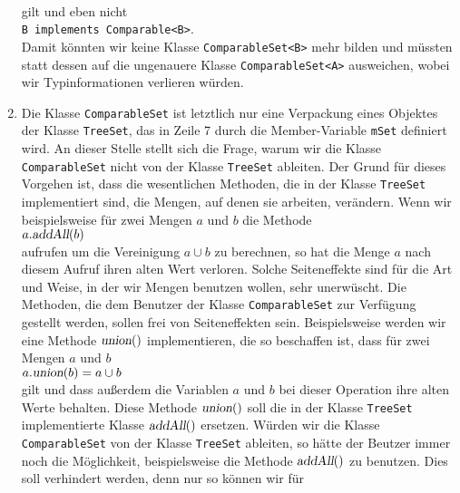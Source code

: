 \begin{enumerate}
      \\[0.2cm]
      gilt und eben nicht
      \\[0.2cm]
      \hspace*{1.3cm}
      \texttt{B implements Comparable<B>}.
      \\[0.2cm]
      Damit k\"onnten wir keine Klasse \texttt{ComparableSet<B>} mehr bilden und
      m\"ussten statt dessen auf die ungenauere Klasse \texttt{ComparableSet<A>} ausweichen,
      wobei  wir Typinformationen verlieren w\"urden.
\item Die Klasse \texttt{ComparableSet} ist letztlich nur eine Verpackung eines 
      Objektes der Klasse \texttt{TreeSet}, das in Zeile 7 durch die Member-Variable
      \texttt{mSet}  definiert wird.  An dieser Stelle stellt sich die Frage,
      warum wir die Klasse \texttt{ComparableSet} nicht von der Klasse \texttt{TreeSet}
      ableiten.  Der Grund f\"ur dieses Vorgehen ist, dass die wesentlichen Methoden, die in der
      Klasse \texttt{TreeSet} implementiert sind, die Mengen, auf denen sie arbeiten,
      ver\"andern.  Wenn wir beispielsweise f\"ur zwei Mengen $a$ und $b$ die Methode
      \\[0.2cm]
      \hspace*{1.3cm}
      $a.\textsl{addAll}(b)$
      \\[0.2cm]
      aufrufen um die Vereinigung $a \cup b$ zu berechnen, so hat die Menge $a$ nach
      diesem Aufruf ihren alten Wert verloren.  Solche Seiteneffekte sind f\"ur die Art und
      Weise, in der wir Mengen benutzen wollen, sehr unerw\"uscht.  Die Methoden, die dem
      Benutzer der Klasse \texttt{ComparableSet} zur Verf\"ugung gestellt werden, sollen
      frei von Seiteneffekten sein.  Beispielsweise werden wir eine Methode $\textsl{union}()$
      implementieren, die so beschaffen ist, dass f\"ur zwei Mengen $a$ und $b$
      \\[0.2cm]
      \hspace*{1.3cm}
      $a.\textsl{union}(b) = a \cup b$
      \\[0.2cm]
      gilt und dass au{\ss}erdem die Variablen $a$ und $b$ bei dieser Operation ihre alten Werte behalten.
      Diese Methode $\textsl{union}()$ soll die in der Klasse \texttt{TreeSet} implementierte Klasse
      $\textsl{addAll}()$ ersetzen.  W\"urden wir die Klasse \texttt{ComparableSet} von der Klasse
      \texttt{TreeSet} ableiten, so h\"atte der Beutzer immer noch die M\"oglichkeit, beispielsweise die
      Methode $\textsl{addAll}()$ zu benutzen.  Dies soll verhindert werden, denn nur so k\"onnen wir f\"ur

\end{enumerate}
